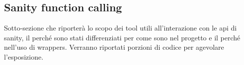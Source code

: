 \subsection{Sanity function calling}

Sotto-sezione che riporterà lo scopo dei tool utili all'interazione con le api di sanity, il perché sono stati differenziati per come sono nel progetto e il perché nell'uso di wrappers.
Verranno riportati porzioni di codice per agevolare l'esposizione.
